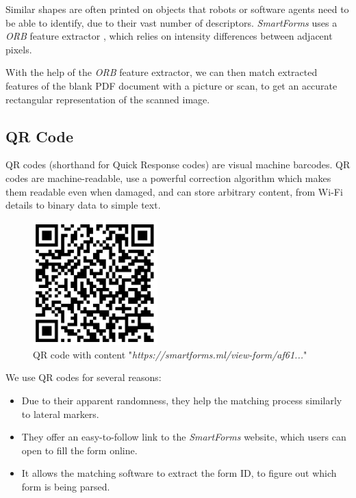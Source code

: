 \documentclass[11pt, a4paper]{report}
\begin{document}
Similar shapes are often printed on objects that robots or software agents need to be able to identify, due to their vast number of descriptors. \textit{SmartForms} uses a \textit{ORB} feature extractor \cite{rublee2011orb}, which relies on intensity differences between adjacent pixels.

With the help of the \textit{ORB} feature extractor, we can then match extracted features of the blank PDF document with a picture or scan, to get an accurate rectangular representation of the scanned image.

\subsection{QR Code}

QR codes (shorthand for Quick Response codes) are visual machine barcodes. QR codes are machine-readable, use a powerful correction algorithm \cite{wicker1999reed} which makes them readable even when damaged, and can store arbitrary content, from Wi-Fi details to binary data to simple text.

\begin{figure}[!h]
    \centering
    \includegraphics[width=13em]{images/screenshoots/sample-qr-code.png}
    \caption{QR code with content "\textit{https://smartforms.ml/view-form/af61...}"}
    \label{qr-code-image}
\end{figure}

We use QR codes for several reasons:
\begin{itemize}
    \item Due to their apparent randomness, they help the matching process similarly to lateral markers.
    \item They offer an easy-to-follow link to the \textit{SmartForms} website, which users can open to fill the form online.
    \item It allows the matching software to extract the form ID, to figure out which form is being parsed.
\end{itemize}
\end{document}
